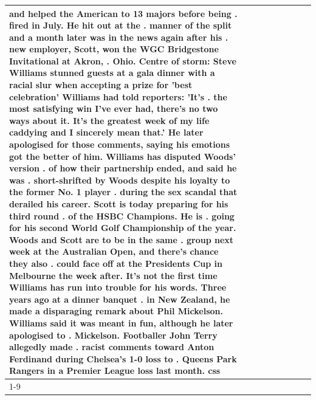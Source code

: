 \begin{table}[H]
\begin{tabular}{lllrlllll}
and helped the American to 13 majors before being . fired in July. He hit out at the . manner of the split and a month later was in the news again after his . new employer, Scott, won the WGC Bridgestone Invitational at Akron, . Ohio. Centre of storm: Steve Williams stunned guests at a gala dinner with a racial slur when accepting a prize for 'best celebration' Williams had told reporters: 'It's . the most satisfying win I've ever had, there's no two ways about it. It's the greatest week of my life caddying and I sincerely mean that.' He later apologised for those comments, saying his emotions got the better of him. Williams has disputed Woods' version . of how their partnership ended, and said he was . short-shrifted by Woods despite his loyalty to the former No. 1 player . during the sex scandal that derailed his career. Scott is today preparing for his third round . of the HSBC Champions. He is . going for his second World Golf Championship of the year. Woods and Scott are to be in the same . group next week at the Australian Open, and there's chance they also . could face off at the Presidents Cup in Melbourne the week after. It's not the first time Williams has run into trouble for his words. Three years ago at a dinner banquet . in New Zealand, he made a disparaging remark about Phil Mickelson. Williams said it was meant in fun, although he later apologised to . Mickelson. Footballer John Terry allegedly made . racist comments toward Anton Ferdinand during Chelsea's 1-0 loss to . Queens Park Rangers in a Premier League loss last month. css \\
\cline{1-9}

\end{tabular}
\end{table}
